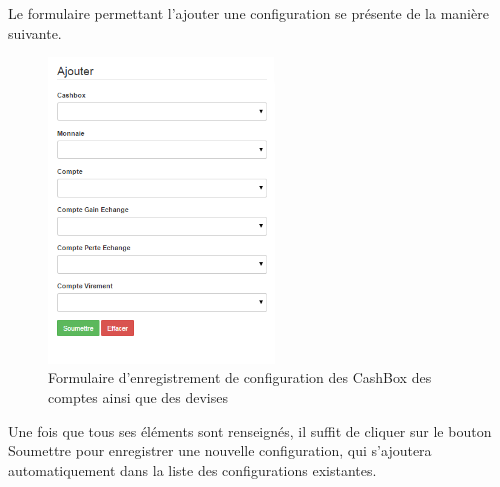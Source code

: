 \documentclass[12pt,a4paper]{report}
\begin{document}
\newpage
Le formulaire permettant l'ajouter une configuration se présente de la manière suivante.
\begin{figure}[h]
\begin{center}
\includegraphics[width=6cm]{pic/AddConfigCash.png}
\end{center}
\caption{Formulaire d'enregistrement de configuration des CashBox des comptes ainsi que des devises}
\label{Formulaire d'enregistrement de configuration des CashBox des comptes ainsi que des devises}
\end{figure} 

Une fois que tous ses éléments sont renseignés, il suffit de cliquer sur le bouton Soumettre pour enregistrer une nouvelle configuration, qui s'ajoutera automatiquement dans la liste des configurations  existantes. 
\end{document}
